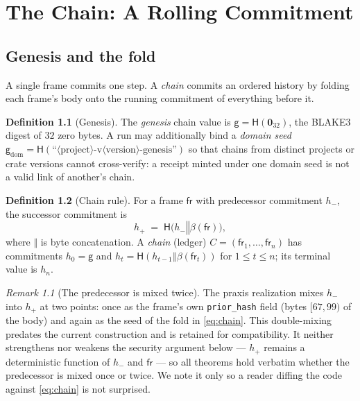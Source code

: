 \documentclass[11pt,oneside]{book}
\theoremstyle{definition}
\newtheorem{definition}{Definition}[chapter]
\theoremstyle{plain}
\theoremstyle{remark}
\newtheorem*{remark}{Remark}
\newcommand{\chainH}{\mathsf{H}}               %
\newcommand{\fr}{\mathsf{fr}}                   %
\newcommand{\body}{\beta}                       %
\newcommand{\code}[1]{\texttt{#1}}
\newcommand{\concat}{\mathbin{\Vert}}           %
\newcommand{\Genesis}{\mathsf{g}}               %
\newcommand{\Ledger}{C}               %
\begin{document}
\chapter{The Chain: A Rolling Commitment}
\label{ch:chain}

\section{Genesis and the fold}

A single frame commits one step. A \emph{chain} commits an ordered history by folding each
frame's body onto the running commitment of everything before it.

\begin{definition}[Genesis]\label{def:genesis}
The \emph{genesis} chain value is $\Genesis=\chainH(\bm 0_{32})$, the BLAKE3 digest of $32$
zero bytes. A run may additionally bind a \emph{domain seed}
$\Genesis_{\mathrm{dom}}=\chainH(\text{``}\langle\text{project}\rangle\text{-v}\langle
\text{version}\rangle\text{-genesis''})$ so that chains from distinct projects or crate
versions cannot cross-verify: a receipt minted under one domain seed is not a valid link of
another's chain.
\end{definition}

\begin{definition}[Chain rule]\label{def:chain}
For a frame $\fr$ with predecessor commitment $h_{-}$, the successor commitment is
\begin{equation}\label{eq:chain}
h_{+} \;=\; \chainH\bigl(h_{-}\concat\body(\fr)\bigr),
\end{equation}
where $\concat$ is byte concatenation. %
A \emph{chain} (ledger) $\Ledger=(\fr_1,\dots,\fr_n)$ has commitments $h_0=\Genesis$ and $h_t=\chainH(h_{t-1}\concat\body(\fr_t))$ for $1\le t\le n$; its terminal value is $h_n$. %
\end{definition}

\begin{remark}[The predecessor is mixed twice]
The praxis realization mixes $h_{-}$ into $h_{+}$ at two points: once as the frame's own \code{prior\_hash} field (bytes $[67,99)$ of the body) and again as the seed of the fold in \eqref{eq:chain}. %
This double-mixing predates the current construction and is retained for compatibility. %
It neither strengthens nor weakens the security argument below --- $h_{+}$ remains a deterministic function of $h_{-}$ and $\fr$ --- so all theorems hold verbatim whether the predecessor is mixed once or twice. %
We note it only so a reader diffing the code against \eqref{eq:chain} is not surprised. %
\end{remark}
\end{document}
